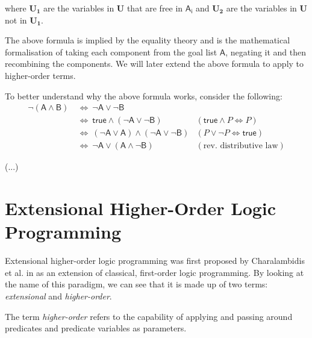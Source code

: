 \documentclass[inscr,ack,preface]{dithesis}
\theoremstyle{definition}
\newcommand{\msf}[1]{$\mathsf{#1}$}
\begin{document}
where \msf{\textbf{U}_\textbf{1}} are the variables in \msf{\textbf{U}} that are free in \msf{A_i} and \msf{\textbf{U}_\textbf{2}} are the variables in \msf{\textbf{U}} not in \msf{\textbf{U}_\textbf{1}}.

The above formula is implied by the equality theory and is the mathematical formalisation of taking each component from the goal list \msf{A}, negating it and then recombining the components. We will later extend the above formula to apply to higher-order terms.

To better understand why the above formula works, consider the following:
\begin{align*}
  \mathsf{\lnot \left( A \land B \right)} & ~\Leftrightarrow~ \mathsf{\lnot A \lor \lnot B} & ~ \\
                                          & ~\Leftrightarrow~ \mathsf{true \land \left( \lnot A \lor \lnot B \right)} & \left( \mathsf{true} \land P \Leftrightarrow P \right) \\
                                          & ~\Leftrightarrow~ \mathsf{\left( \lnot A \lor A \right) \land \left( \lnot A \lor \lnot B \right)} & \left( P \lor \lnot P \Leftrightarrow \mathsf{true} \right) \\
                                          & ~\Leftrightarrow~ \mathsf{\lnot A \lor \left( A \land \lnot B \right)} & (\text{rev. distributive law})
\end{align*}

(...)

\section{Extensional Higher-Order Logic Programming}
Extensional higher-order logic programming was first proposed by Charalambidis et al. in \cite{DBLP:journals/tocl/CharalambidisHRW13} as an extension of classical, first-order logic programming. By looking at the name of this paradigm, we can see that it is made up of two terms: \emph{extensional} and \emph{higher-order}.

The term \emph{higher-order} refers to the capability of applying and passing around predicates and predicate variables as parameters.
\end{document}
